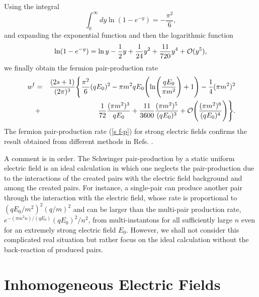 \documentclass[a4paper,prd,showpacs,preprintnumbers,amsmath,amssymb]{revtex4}
\begin{document}
Using the integral \cite{pbm}
\begin{equation}
\int_0^{\infty} dy \ln (1 - e^{-y}) = - \frac{\pi^2}{6},
\end{equation}
and expanding the exponential function and then the logarithmic
function
\begin{equation}
\ln ( 1 - e^{-y}) = \ln y - \frac{1}{2} y + \frac{1}{24} y^2 +
\frac{11}{720} y^4 + {\cal O} (y^5),
\end{equation}
we finally obtain the fermion pair-production rate
\begin{eqnarray}
w^{\rm f} &=& \frac{(2s+1)}{(2 \pi)^3} \Biggl\{ \frac{\pi^2}{6}
(qE_0)^2 - \pi m^2 q E_0 \Biggl(\ln \Biggl(\frac{qE_0}{\pi m^2}
\Biggr) + 1 \Biggr) - \frac{1}{4} (\pi m^2)^2 \nonumber\\~~~~&+&
\frac{1}{72} \frac{(\pi m^2)^3}{qE_0} + \frac{11}{3600} \frac{(\pi
m^2)^5}{(qE_0)^3}  + {\cal O} \Biggl(\frac{(\pi m^2)^6}{(qE_0)^4}
\Biggr) \Biggr\}. \label{s f-p}
\end{eqnarray}
The fermion pair-production rate (\ref{s f-p}) for strong electric
fields confirms the result obtained from different methods in
Refs. \cite{dit,hey,sol}.





A comment is in order. The Schwinger pair-production by a static
uniform electric field is an ideal calculation in which one
neglects the pair-production due to the interactions of the
created pairs with the electric field background and among the
created pairs. For instance, a single-pair can produce another
pair through the interaction with the electric field, whose rate
is proportional to $(qE_0/m^2)^2 (q/m)^2$ \cite{jau} and can be
larger than the multi-pair production rate, $e^{- (\pi m^2
n)/(qE_0)} (qE_0)^2/n^2$, from multi-instantons for all
sufficiently large $n$ even for an extremely strong electric field
$E_0$. However, we shall not consider this complicated real
situation but rather focus on the ideal calculation without the
back-reaction of produced pairs.







\section{Inhomogeneous Electric Fields}
\end{document}
